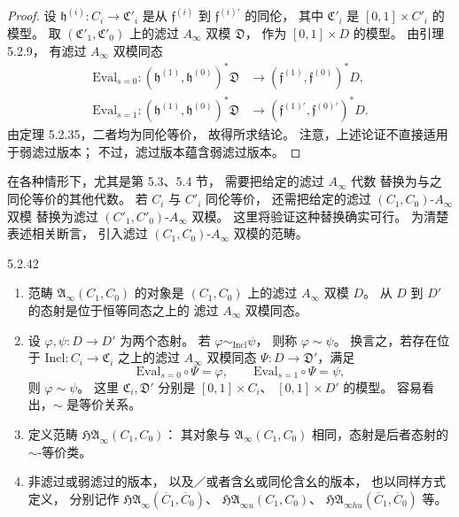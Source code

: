 \begin{proof}
设
$\mathfrak h^{(i)}:C_i\to\mathfrak C'_i$
是从 $\mathfrak f^{(i)}$ 到
$\mathfrak f^{(i)'}$ 的同伦，
其中 $\mathfrak C'_i$
是 $[0,1]\times C'_i$ 的模型。
取 $(\mathfrak C'_1,\mathfrak C'_0)$
上的滤过 $A_\infty$ 双模
$\mathfrak D$，
作为 $[0,1]\times D$ 的模型。
由引理 5.2.9，
有滤过 $A_\infty$ 双模同态
\[
\begin{aligned}
\mathrm{Eval}_{s=0}:
(\mathfrak h^{(1)},\mathfrak h^{(0)})^*\mathfrak D
&\longrightarrow
(\mathfrak f^{(1)},\mathfrak f^{(0)})^*D,\\
\mathrm{Eval}_{s=1}:
(\mathfrak h^{(1)},\mathfrak h^{(0)})^*\mathfrak D
&\longrightarrow
(\mathfrak f^{(1)'},\mathfrak f^{(0)'})^*D.
\end{aligned}
\]
由定理 5.2.35，二者均为同伦等价，
故得所求结论。
注意，上述论证不直接适用于弱滤过版本；
不过，滤过版本蕴含弱滤过版本。
\end{proof}

在各种情形下，尤其是第 5.3、5.4 节，
需要把给定的滤过 $A_\infty$ 代数
替换为与之同伦等价的其他代数。
若 $C_i$ 与 $C'_i$ 同伦等价，
还需把给定的滤过
$(C_1,C_0)$-$A_\infty$ 双模
替换为滤过
$(C'_1,C'_0)$-$A_\infty$ 双模。
这里将验证这种替换确实可行。
为清楚表述相关断言，
引入滤过 $(C_1,C_0)$-$A_\infty$
双模的范畴。

\begin{definition}{5.2.42}\label{def:5-2-42}
\begin{enumerate}[label=\textup{(\arabic*)},leftmargin=2.8em]
\item 范畴
$\mathfrak A_\infty(C_1,C_0)$
的对象是 $(C_1,C_0)$ 上的滤过
$A_\infty$ 双模 $D$。
从 $D$ 到 $D'$ 的态射是位于恒等同态之上的
滤过 $A_\infty$ 双模同态。
\item 设 $\varphi,\psi:D\to D'$ 为两个态射。
若 $\varphi\sim_{\mathrm{Incl}}\psi$，
则称 $\varphi\sim\psi$。
换言之，若存在位于
$\mathrm{Incl}:C_i\to\mathfrak C_i$
之上的滤过 $A_\infty$ 双模同态
$\Psi:D\to\mathfrak D'$，满足
\[
\mathrm{Eval}_{s=0}\circ\Psi=\varphi,
\qquad
\mathrm{Eval}_{s=1}\circ\Psi=\psi,
\]
则 $\varphi\sim\psi$。
这里 $\mathfrak C_i,\mathfrak D'$
分别是 $[0,1]\times C_i$、
$[0,1]\times D'$ 的模型。
容易看出，$\sim$ 是等价关系。
\item 定义范畴
$\mathfrak{HA}_\infty(C_1,C_0)$：
其对象与
$\mathfrak A_\infty(C_1,C_0)$
相同，态射是后者态射的
$\sim$-等价类。
\item 非滤过或弱滤过的版本，
以及／或者含幺或同伦含幺的版本，
也以同样方式定义，
分别记作
$\mathfrak{HA}_\infty(\overline C_1,\overline C_0)$、
$\mathfrak{HA}_{\infty u}(C_1,C_0)$、
$\mathfrak{HA}_{\infty hu}
(\overline C_1,\overline C_0)$ 等。
\end{enumerate}
\end{definition}

